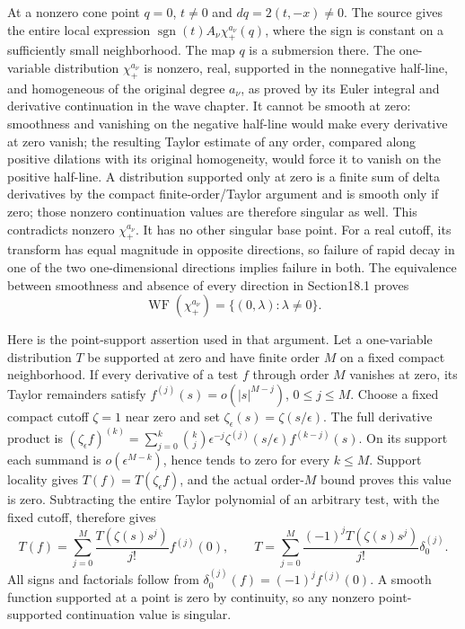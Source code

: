 \documentclass[
  11pt,
]{article}
\begin{document}
At a nonzero cone point \(q=0\), \(t\ne0\) and \(dq=2(t,-x)\ne0\). The
source gives the entire local expression
\(\operatorname{sgn}(t)A_\nu\chi_+^{a_\nu}(q)\), where the sign is
constant on a sufficiently small neighborhood. The map \(q\) is a
submersion there. The one-variable distribution \(\chi_+^{a_\nu}\) is
nonzero, real, supported in the nonnegative half-line, and homogeneous
of the original degree \(a_\nu\), as proved by its Euler integral and
derivative continuation in the wave chapter. It cannot be smooth at
zero: smoothness and vanishing on the negative half-line would make
every derivative at zero vanish; the resulting Taylor estimate of any
order, compared along positive dilations with its original homogeneity,
would force it to vanish on the positive half-line. A distribution
supported only at zero is a finite sum of delta derivatives by the
compact finite-order/Taylor argument and is smooth only if zero; those
nonzero continuation values are therefore singular as well. This
contradicts nonzero \(\chi_+^{a_\nu}\). It has no other singular base
point. For a real cutoff, its transform has equal magnitude in opposite
directions, so failure of rapid decay in one of the two one-dimensional
directions implies failure in both. The equivalence between smoothness
and absence of every direction in Section18.1 proves \[
\operatorname{WF}(\chi_+^{a_\nu})
=\{(0,\lambda):\lambda\ne0\}.
\tag{WF32}
\]

Here is the point-support assertion used in that argument. Let a
one-variable distribution \(T\) be supported at zero and have finite
order \(M\) on a fixed compact neighborhood. If every derivative of a
test \(f\) through order \(M\) vanishes at zero, its Taylor remainders
satisfy \(f^{(j)}(s)=o(|s|^{M-j})\), \(0\leq j\leq M\). Choose a fixed
compact cutoff \(\zeta=1\) near zero and set
\(\zeta_\epsilon(s)=\zeta(s/\epsilon)\). The full derivative product is
\((\zeta_\epsilon f)^{(k)}
=\sum_{j=0}^k\binom{k}{j}\epsilon^{-j}
\zeta^{(j)}(s/\epsilon)f^{(k-j)}(s)\). On its support each summand is
\(o(\epsilon^{M-k})\), hence tends to zero for every \(k\leq M\).
Support locality gives \(T(f)=T(\zeta_\epsilon f)\), and the actual
order-\(M\) bound proves this value is zero. Subtracting the entire
Taylor polynomial of an arbitrary test, with the fixed cutoff, therefore
gives \[
T(f)=\sum_{j=0}^M\frac{T(\zeta(s)s^j)}{j!}f^{(j)}(0),
\qquad
T=\sum_{j=0}^M
\frac{(-1)^jT(\zeta(s)s^j)}{j!}\delta_0^{(j)} .
\tag{WF32a}
\] All signs and factorials follow from
\(\delta_0^{(j)}(f)=(-1)^jf^{(j)}(0)\). A smooth function supported at a
point is zero by continuity, so any nonzero point-supported continuation
value is singular.
\end{document}
